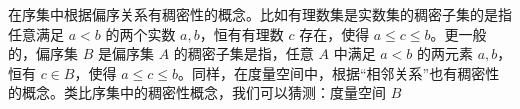 
在序集中根据偏序关系有稠密性的概念。比如有理数集是实数集的稠密子集的是指任意满足 $a<b$ 的两个实数 $a,b$，恒有有理数 $c$ 存在，使得 $a\leq c\leq b$。更一般的，偏序集 $B$ 是偏序集 $A$ 的稠密子集是指，任意 $A$ 中满足 $a<b$ 的两元素 $a,b$，恒有 $c\in B$，使得 $a\leq c\leq b$。同样，在度量空间中，根据“相邻关系”也有稠密性的概念。类比序集中的稠密性概念，我们可以猜测：度量空间 $B$ 